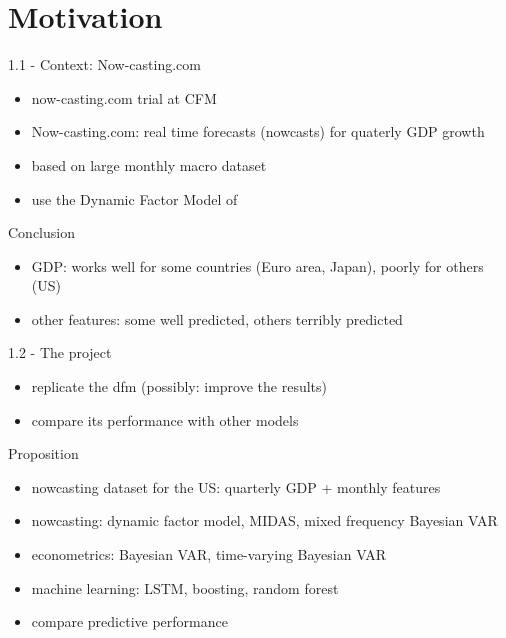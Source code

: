 \section{Motivation}


\begin{frame}{1.1 - Context: Now-casting.com}
	\begin{itemize}
	\item now-casting.com trial at CFM
	\item Now-casting.com: real time forecasts (nowcasts) for quaterly GDP growth
	\item based on large monthly macro dataset 
	\item use the Dynamic Factor Model of \cite{Giannone2008}
	\end{itemize}

	\pause
	
	\begin{block}{Conclusion}
		\begin{itemize}
		\item GDP: works well for some countries (Euro area, Japan), poorly for others (US)
		\item other features: some well predicted, others terribly predicted
		\end{itemize}
	\end{block}	
\end{frame}


\begin{frame}{1.2 - The project}
	\begin{itemize}
		\item replicate the dfm (possibly: improve the results)
		\item compare its performance with other models
	\end{itemize}

	\pause
	
	\begin{block}{Proposition}
		\begin{itemize}
			\item nowcasting dataset for the US: quarterly GDP + monthly features
			\item nowcasting: dynamic factor model, MIDAS, mixed frequency Bayesian VAR
			\item econometrics: Bayesian VAR, time-varying Bayesian VAR
			\item machine learning: LSTM, boosting, random forest
			\item compare predictive performance
		\end{itemize}
	\end{block}	
\end{frame}




